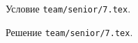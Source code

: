 \problem{}
Условие \texttt{team/senior/7.tex}.

\solution Решение \texttt{team/senior/7.tex}.
\endproblem
